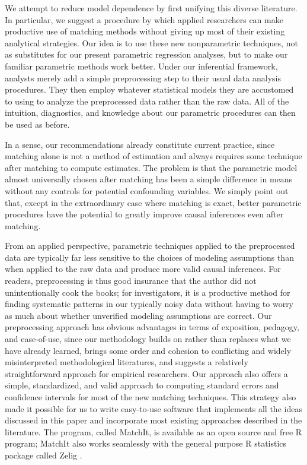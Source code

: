\documentclass[11pt,titlepage]{article}
\begin{document}
We attempt to reduce model dependence by first unifying this diverse
literature.  In particular, we suggest a procedure by which applied
researchers can make productive use of matching methods without giving
up most of their existing analytical strategies.  Our idea is to use
these new nonparametric techniques, not as substitutes for our present
parametric regression analyses, but to make our familiar parametric
methods work better.  Under our inferential framework, analysts merely
add a simple preprocessing step to their usual data analysis
procedures.  They then employ whatever statistical models they are
accustomed to using to analyze the preprocessed data rather than the
raw data.  All of the intuition, diagnostics, and knowledge about our
parametric procedures can then be used as before.

In a sense, our recommendations already constitute current practice,
since matching alone is not a method of estimation and always requires
some technique after matching to compute estimates.  The problem is
that the parametric model almost universally chosen after matching has
been a simple difference in means without any controls for potential
confounding variables.  We simply point out that, except in the
extraordinary case where matching is exact, better parametric
procedures have the potential to greatly improve causal inferences
even after matching.

From an applied perspective, parametric techniques applied to the
preprocessed data are typically far less sensitive to the choices of
modeling assumptions than when applied to the raw data and produce
more valid causal inferences.  For readers, preprocessing is thus good
insurance that the author did not unintentionally cook the books; for
investigators, it is a productive method for finding systematic
patterns in our typically noisy data without having to worry as much
about whether unverified modeling assumptions are correct.  Our
preprocessing approach has obvious advantages in terms of exposition,
pedagogy, and ease-of-use, since our methodology builds on rather than
replaces what we have already learned, brings some order and cohesion
to conflicting and widely misinterpreted methodological literatures,
and suggests a relatively straightforward approach for empirical
researchers. Our approach also offers a simple, standardized, and
valid approach to computing standard errors and confidence intervals
for most of the new matching techniques.  This strategy also made it
possible for us to write easy-to-use software that implements all the
ideas discussed in this paper and incorporate most existing approaches
described in the literature.  The program, called MatchIt, is
available as an open source and free R program; MatchIt also works
seamlessly with the general purpose R statistics package called Zelig
\citep{ImaKinLau04}.
\end{document}
